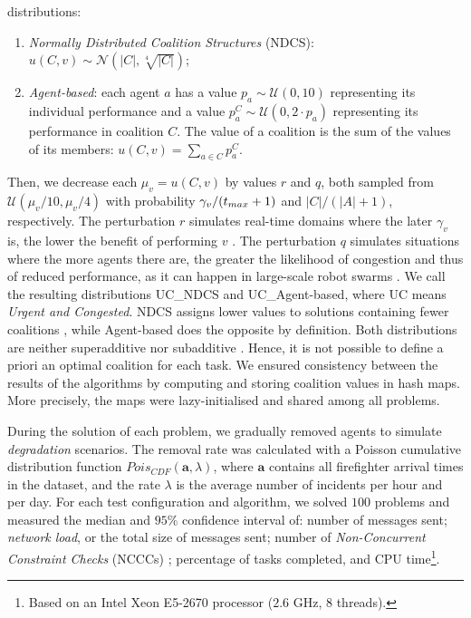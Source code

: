 distributions:
\begin{enumerate}
    \item \emph{Normally Distributed Coalition Structures} (NDCS): $u(C, v) \sim
        \mathcal{N}(|C|, \sqrt[4]{|C|})$;
    \item \emph{Agent-based}: each agent $a$ has a value $p_a \sim \mathcal{U}(0,
        10)$ representing its individual performance and a value $p_a^C \sim
        \mathcal{U}(0, 2 \cdot p_a)$ representing its performance in coalition
        $C$. The value of a coalition is the sum of the values of its members:
        $u(C, v) = \sum_{a \in C} p_a^C$.
\end{enumerate}
Then, we decrease each $\mu_v = u(C, v)$ by values $r$ and $q$, both sampled from
$\mathcal{U}(\mu_v / 10, \mu_v / 4)$ with probability $\gamma_v/(t_{max} + 1)$ and $|C|/(|A|
+ 1)$, respectively. The perturbation $r$ simulates real-time domains where the later
$\gamma_v$ is, the lower the benefit of performing $v$ \cite{stankovic2013edf}. The
perturbation $q$ simulates situations where the more agents there are, the greater the
likelihood of congestion and thus of reduced performance, as it can happen in large-scale
robot swarms \cite{guerrero2017}. We call the resulting distributions UC\_NDCS and
UC\_Agent-based, where UC means \emph{Urgent and Congested}. NDCS assigns lower values to
solutions containing fewer coalitions \cite{rahwan2009}, while Agent-based does the
opposite by definition. Both distributions are neither superadditive nor subadditive
\cite{rahwan2015survey}. Hence, it is not possible to define a priori an optimal coalition
for each task.
We ensured consistency between the results of the algorithms by computing and storing
coalition values in hash maps. More precisely, the maps were lazy-initialised and shared
among all problems.

During the solution of each problem, we gradually removed agents to simulate
\emph{degradation} scenarios. The removal rate was calculated with a Poisson cumulative
distribution function $Pois_{CDF}(\bm{a}, \lambda)$, where $\bm{a}$ contains all
firefighter arrival times in the dataset, and the rate $\lambda$ is the average number of
incidents per hour and per day. For each test configuration and algorithm, we solved
$100$ problems and measured the median and $95\%$ confidence interval of: number of
messages sent; \emph{network load}, or the total size of messages sent; number of
\emph{Non-Concurrent Constraint Checks} (NCCCs) \cite{meisels2007}; percentage of tasks
completed, and CPU time\footnote{Based on an Intel Xeon E5-2670 processor ($2.6$ GHz, $8$
threads).}.

